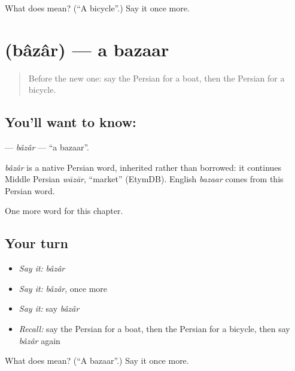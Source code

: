 \begin{tcolorbox}[breakable,colback=teal!4,colframe=teal!35!black,title={Before you move on}]
What does  mean? (\textquotedblleft{}A bicycle\textquotedblright{}.) Say it once more.
\end{tcolorbox}
\section[\texorpdfstring{\fa{بازار} (bâzâr)}{بازار (bâzâr)}]{ (bâzâr) — a bazaar}

\label{lesson:FA-C72-bazar}



\begin{quote}
Before the new one: say the Persian for a boat, then the Persian for a bicycle.
\end{quote}

\subsection*{You'll want to know: }
\textbf{} — \emph{bâzâr} — \textquotedblleft{}a bazaar\textquotedblright{}.

\begin{cousinweb}
\emph{bâzâr} is a native Persian word, inherited rather than borrowed: it continues Middle Persian \emph{wāzār}, \textquotedblleft{}market\textquotedblright{} (EtymDB). English \emph{bazaar} comes from this Persian word.
\end{cousinweb}

\begin{grammarlens}[title={What you've built}]
One more word for this chapter.
\end{grammarlens}

\subsection*{Your turn}
\begin{itemize}
\raggedright
  \item \emph{Say it:} \emph{bâzâr}
  \item \emph{Say it:} \emph{bâzâr}, once more
  \item \emph{Say it:} say \emph{bâzâr}
  \item \emph{Recall:} say the Persian for a boat, then the Persian for a bicycle, then say \emph{bâzâr} again
\end{itemize}

\begin{tcolorbox}[breakable,colback=teal!4,colframe=teal!35!black,title={Before you move on}]
What does  mean? (\textquotedblleft{}A bazaar\textquotedblright{}.) Say it once more.
\end{tcolorbox}
